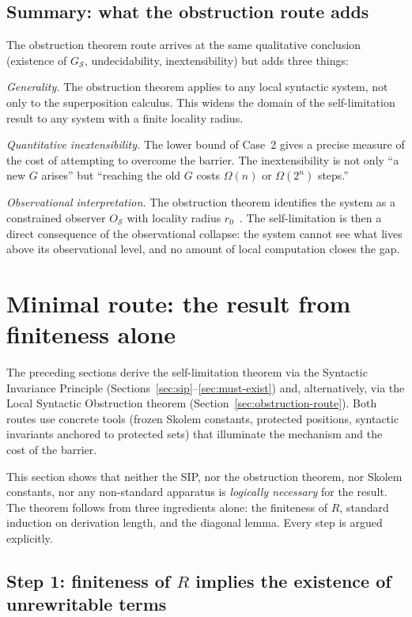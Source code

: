 \documentclass[11pt]{article}
\begin{document}
\subsection{Summary: what the obstruction route adds}

The obstruction theorem route arrives at the same qualitative
conclusion (existence of $G_{\mathcal{S}}$, undecidability,
inextensibility) but adds three things:

\emph{Generality.} The obstruction theorem applies to any local
syntactic system, not only to the superposition calculus. This widens
the domain of the self-limitation result to any system with a finite
locality radius.

\emph{Quantitative inextensibility.} The lower bound of Case~2 gives a
precise measure of the cost of attempting to overcome the barrier. The
inextensibility is not only ``a new $G$ arises'' but ``reaching the old
$G$ costs $\Omega(n)$ or $\Omega(2^n)$ steps.''

\emph{Observational interpretation.} The obstruction theorem identifies
the system as a constrained observer $O_{\mathcal{S}}$ with locality
radius $r_0$~\cite[Remark~7.2]{buono2026obstruction}. The
self-limitation is then a direct consequence of the observational
collapse: the system cannot see what lives above its observational
level, and no amount of local computation closes the gap.


\section{Minimal route: the result from finiteness alone}
\label{sec:minimal}


The preceding sections derive the self-limitation theorem via the
Syntactic Invariance Principle (Sections~\ref{sec:sip}--\ref{sec:must-exist})
and, alternatively, via the Local Syntactic Obstruction theorem
(Section~\ref{sec:obstruction-route}). Both routes use concrete tools
(frozen Skolem constants, protected positions, syntactic invariants
anchored to protected sets) that illuminate the mechanism and the cost
of the barrier.

This section shows that neither the SIP, nor the obstruction theorem,
nor Skolem constants, nor any non-standard apparatus is \emph{logically
necessary} for the result. The theorem follows from three ingredients
alone: the finiteness of $R$, standard induction on derivation length,
and the diagonal lemma. Every step is argued explicitly.

\subsection{Step 1: finiteness of $R$ implies the existence of
unrewritable terms}
\end{document}
